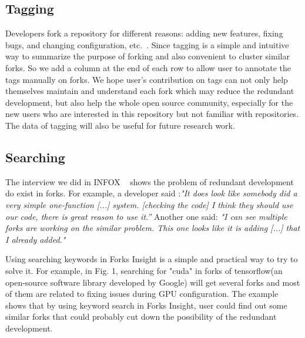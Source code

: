 \subsection{Tagging}
%
Developers fork a repository for different reasons: adding new features, fixing bugs, and changing configuration, etc.~\cite{Mikkonen2011,Robles2012,dubinsky2013exploratory,stanciulescu2015forked}.
%
Since tagging is a simple and intuitive way to summarize the purpose of forking and also convenient to cluster similar forks. So we add a column at the end of each row to allow user to annotate the tags manually on forks. We hope user's contribution on tags can not only help themselves maintain and understand each fork which may reduce the redundant development, but also help the whole open source community, especially for the new users who are interested in this repository but not familiar with repositories. The data of tagging will also be useful for future research work.


\subsection{Searching}

The interview we did in INFOX ~\cite{ZSLXWK:ICSE18} shows the problem of redundant development do exist in forks. For example, a developer said :\emph{"It does look like somebody did a very simple one-function [...] system. [checking the code] I think they should use our code, there is great reason to use it.''} Another one said: \emph{"I can see multiple forks are working on the similar problem. This one looks like it is adding [...] that I already added."}

Using searching keywords in Forks Insight is a simple and practical way to try to solve it. For example, in Fig. 1, searching for "cuda" in forks of tensorflow(an open-source software library developed by Google) will get several forks and most of them are related to fixing issues during GPU configuration. The example shows that by using keyword search in Forks Insight, user could find out some similar forks that could probably cut down the possibility of the redundant development.

\iffalse
\begin{figure}[H]
\centering
\texttt{[image: shot2.png]}
\caption{An example of searching for similar forks.}
\vspace{-10pt}
\end{figure}
\fi

